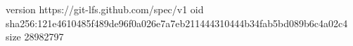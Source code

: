version https://git-lfs.github.com/spec/v1
oid sha256:121e4610485f489de96f0a026e7a7eb211444310444b34fab5bd089b6c4a02c4
size 28982797
